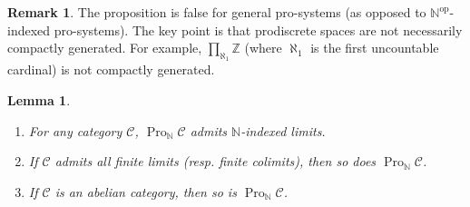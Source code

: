 \documentclass[11pt]{amsart}
\newcommand{\N}{\mathbb{N}}
\newcommand{\Z}{\mathbb{Z}}
\newcommand{\cC}{\mathcal{C}} %
\newcommand{\op}{{\operatorname{op}}}
\newcommand{\Pro}{\operatorname{Pro}}
\theoremstyle{plain}
\newtheorem{lem}[prop]{Lemma}
\theoremstyle{definition}
\newtheorem{rmk}[prop]{Remark}
\numberwithin{equation}{prop}
\begin{document}
\begin{rmk}
The proposition is false for general pro-systems (as opposed to $\N^\op$-indexed pro-systems). 
The key point is that prodiscrete spaces are not necessarily compactly generated. 
For example, $\prod_{\aleph_1} \Z$ (where $\aleph_1$ is the first uncountable cardinal) is not compactly generated.
\end{rmk}


\begin{lem}\label{liminProNC}
\begin{enumerate}
\item 
For any category $\cC$, $\Pro_{\N}\cC$ admits $\N$-indexed limits.
\item 
If $\cC$ admits all finite limits (resp. finite colimits), then so does $\Pro_{\N}\cC$.
\item 
If $\cC$ is an abelian category, then so is $\Pro_{\N}\cC$.
\end{enumerate}

\end{lem}
\end{document}
